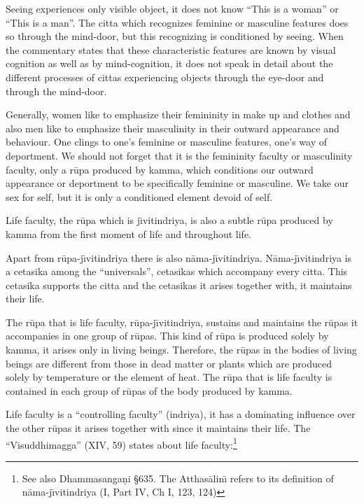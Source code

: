 \documentclass{book}
\begin{document}
Seeing experiences only visible object, it does not know ``This is a
woman'' or ``This is a man''. The citta which recognizes feminine or
masculine features does so through the mind-door, but this
recognizing is conditioned by seeing. When the commentary states that
these characteristic features are known by visual cognition as
well as by mind-cognition, it does not speak in detail about the
different processes of cittas experiencing objects through the
eye-door and through the mind-door.

Generally, women like to emphasize their feminin\-ity in ma\-ke up and
clothes and also men like to emphasize their masculinity in their
outward appearance and behaviour. One clings to one's feminine or
masculine features, one's way of deportment. We should not forget that
it is the femininity faculty or masculinity faculty, only a r\=upa
produced by kamma, which conditions our outward appearance or
deportment to be specifically feminine or masculine. We take our sex
for self, but it is only a conditioned element devoid of self.




Life faculty, the r\=upa which is j\=\i vitindriya, is also a subtle
r\=upa produced by kamma from the first moment of life and throughout
life. 

Apart from r\=upa-j\=\i vitindriya there is also
n{\=a}ma-j\=\i vitindriya. N{\=a}ma-j\=\i vitindriya is a cetasika
among the ``universals'', cetasikas which accompany every citta. This
cetasika supports the citta and the cetasikas it arises together with,
it maintains their life. 

The r\=upa that is life faculty, r\=upa-j\=\i vitindriya, sustains and
maintains the r\=upas it accompanies in one group of r\=upas. This kind
of r\=upa is produced solely by kamma, it arises only in living beings.
Therefore, the r\=upas in the bodies of living beings are different
from those in dead matter or plants which are produced solely by
temperature or the element of heat. The r\=upa that is life faculty is
contained in each group of r\=upas of the body produced by kamma. 

Life faculty is a ``controlling faculty'' (indriya), it has a dominating
influence over the other r\=upas it arises together with since it
maintains their life. The ``Visuddhimagga'' (XIV, 59) states about life
faculty:\footnote{See also Dhamma\-sanga\d ni {\S}635.
The Atthas{\=a}lin\=\i{}  refers to its definition of
n{\=a}ma-j\=\i vitindriya (I, Part IV, Ch I, 123, 124)} 
\end{document}
